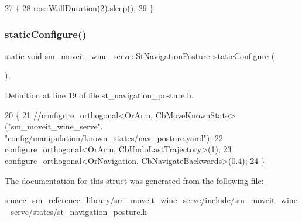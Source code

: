\begin{DoxyCode}
27         \{
28             ros::WallDuration(2).sleep();
29         \}
\end{DoxyCode}
\mbox{\label{structsm__moveit__wine__serve_1_1StNavigationPosture_a0f10086af692fc861bb61395bb964e72}} 
\subsubsection{\texorpdfstring{static\+Configure()}{staticConfigure()}}
{\footnotesize\ttfamily static void sm\+\_\+moveit\+\_\+wine\+\_\+serve\+::\+St\+Navigation\+Posture\+::static\+Configure (\begin{DoxyParamCaption}{ }\end{DoxyParamCaption})\hspace{0.3cm}{\ttfamily [inline]}, {\ttfamily [static]}}



Definition at line 19 of file st\+\_\+navigation\+\_\+posture.\+h.


\begin{DoxyCode}
20         \{
21             \textcolor{comment}{//configure\_orthogonal<OrArm, CbMoveKnownState>("sm\_moveit\_wine\_serve",
       "config/manipulation/known\_states/nav\_posture.yaml");}
22             configure\_orthogonal<OrArm, CbUndoLastTrajectory>(1);
23             configure\_orthogonal<OrNavigation, CbNavigateBackwards>(0.4);
24         \}
\end{DoxyCode}


The documentation for this struct was generated from the following file\+:\begin{DoxyCompactItemize}
\item 
smacc\+\_\+sm\+\_\+reference\+\_\+library/sm\+\_\+moveit\+\_\+wine\+\_\+serve/include/sm\+\_\+moveit\+\_\+wine\+\_\+serve/states/\hyperlink{sm__moveit__wine__serve_2include_2sm__moveit__wine__serve_2states_2st__navigation__posture_8h}{st\+\_\+navigation\+\_\+posture.\+h}\end{DoxyCompactItemize}

